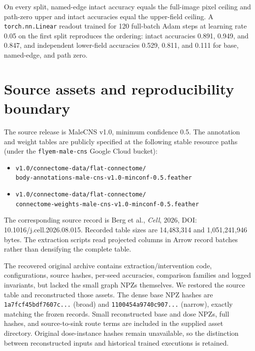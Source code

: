 \documentclass[10pt,letterpaper]{article}
\begin{document}
On every split, named-edge intact accuracy equals the full-image pixel
ceiling and path-zero upper and intact accuracies equal the upper-field
ceiling. A \texttt{torch.nn.Linear} readout trained for 120 full-batch Adam
steps at learning rate 0.05 on the first split reproduces the ordering:
intact accuracies 0.891, 0.949, and 0.847, and independent lower-field
accuracies 0.529, 0.811, and 0.111 for base, named-edge, and path zero.

\section{Source assets and reproducibility boundary}

The source release is MaleCNS v1.0, minimum confidence 0.5. The annotation
and weight tables are publicly specified at the following stable resource
paths (under the \texttt{flyem-male-cns} Google Cloud bucket):
\begin{itemize}
\item \texttt{v1.0/connectome-data/flat-connectome/}\\
\texttt{body-annotations-male-cns-v1.0-minconf-0.5.feather}
\item \texttt{v1.0/connectome-data/flat-connectome/}\\
\texttt{connectome-weights-male-cns-v1.0-minconf-0.5.feather}
\end{itemize}
The corresponding source record is Berg et al., \emph{Cell}, 2026,
DOI: 10.1016/j.cell.2026.08.015. Recorded table sizes are 14,483,314
and 1,051,241,946 bytes. The extraction scripts read projected columns
in Arrow record batches rather than densifying the complete table.

The recovered original archive contains extraction/intervention code,
configurations, source hashes, per-seed accuracies, comparison families
and logged invariants, but lacked the small graph NPZs themselves.
We restored the source table and reconstructed those assets. The dense
base NPZ hashes are
\texttt{1a7fcf45bdf7607c...} (broad) and
\texttt{1100454a9740c907...} (narrow), exactly matching the frozen records.
Small reconstructed base and dose NPZs, full hashes, and source-to-sink
route terms are included in the supplied asset directory. Original
dose-instance hashes remain unavailable, so the distinction between
reconstructed inputs and historical trained executions is retained.
\end{document}
